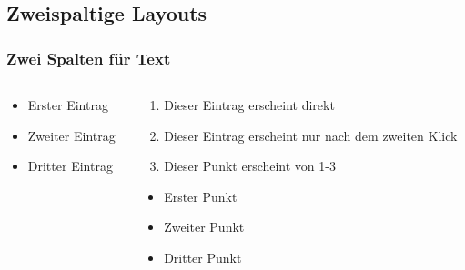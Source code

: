 \documentclass[9pt]{beamer}
\begin{document}
\subsection{Zweispaltige Layouts}
\begin{frame}
  \frametitle{Zwei Spalten für Text}
  \begin{columns}[T]
    \begin{column}{0.49\textwidth}
      \begin{itemize}[<+->] %
        \item Erster  Eintrag
        \item Zweiter Eintrag
        \item Dritter Eintrag
      \end{itemize}
    \end{column}
    \begin{column}{0.49\textwidth}
      \begin{enumerate}
        \item<1-> Dieser Eintrag erscheint direkt
        \item<2>  Dieser Eintrag erscheint nur nach dem zweiten Klick
        \item<1-3> Dieser Punkt erscheint von 1-3
      \end{enumerate}
      \begin{itemize}[<+->]
        \item Erster  Punkt
        \item Zweiter Punkt
        \item Dritter Punkt
      \end{itemize}
    \end{column}
  \end{columns}
\end{frame}
\end{document}
